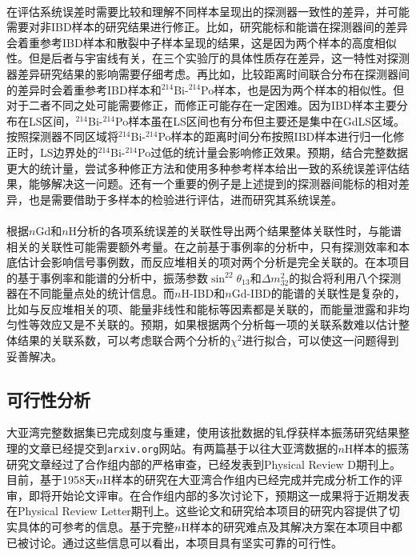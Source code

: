 \documentclass[a4paper,zihao=-4]{article}
\begin{document}
\paragraph{}在评估系统误差时需要比较和理解不同样本呈现出的探测器一致性的差异，并可能需要对非IBD样本的研究结果进行修正。比如，研究能标和能谱在探测器间的差异会着重参考IBD样本和散裂中子样本呈现的结果，这是因为两个样本的高度相似性。但是后者与宇宙线有关，在三个实验厅的具体性质存在差异，这一特性对探测器差异研究结果的影响需要仔细考虑。再比如，比较距离时间联合分布在探测器间的差异时会着重参考IBD样本和$^{214}$Bi-$^{214}$Po样本，也是因为两个样本的相似性。但对于二者不同之处可能需要修正，而修正可能存在一定困难。因为IBD样本主要分布在LS区间，$^{214}$Bi-$^{214}$Po样本虽在LS区间也有分布但主要还是集中在GdLS区域。按照探测器不同区域将$^{214}$Bi-$^{214}$Po样本的距离时间分布按照IBD样本进行归一化修正时，LS边界处的$^{214}$Bi-$^{214}$Po过低的统计量会影响修正效果。预期，结合完整数据更大的统计量，尝试多种修正方法和使用多种参考样本给出一致的系统误差评估结果，能够解决这一问题。还有一个重要的例子是上述提到的探测器间能标的相对差异，也是需要借助于多样本的检验进行评估，进而研究其系统误差。
 \paragraph{}根据$n$Gd和$n$H分析的各项系统误差的关联性导出两个结果整体关联性时，与能谱相关的关联性可能需要额外考量。在之前基于事例率的分析中，只有探测效率和本底估计会影响信号事例数，而反应堆相关的项对两个分析是完全关联的。在本项目的基于事例率和能谱的分析中，振荡参数$\sin^22\theta_{13}$和$\Delta m_{32}^2$的拟合将利用八个探测器在不同能量点处的统计信息。而$n$H-IBD和$n$Gd-IBD的能谱的关联性是复杂的，比如与反应堆相关的项、能量非线性和能标等因素都是关联的，而能量泄露和非均匀性等效应又是不关联的。预期，如果根据两个分析每一项的关联系数难以估计整体结果的关联系数，可以考虑联合两个分析的$\chi^2$进行拟合，可以使这一问题得到妥善解决。

\subsection{可行性分析}

大亚湾完整数据集已完成刻度与重建，使用该批数据的钆俘获样本振荡研究结果整理的文章已经提交到\texttt{arxiv.org}网站。有两篇基于以往大亚湾数据的$n$H样本的振荡研究文章经过了合作组内部的严格审查，已经发表到Physical Review D期刊上。目前，基于1958天$n$H样本的研究在大亚湾合作组内已经完成并完成分析工作的评审，即将开始论文评审。在合作组内部的多次讨论下，预期这一成果将于近期发表在Physical Review Letter期刊上。这些论文和研究给本项目的研究内容提供了切实具体的可参考的信息。基于完整$n$H样本的研究难点及其解决方案在本项目中都已被讨论。通过这些信息可以看出，本项目具有坚实可靠的可行性。
\end{document}
